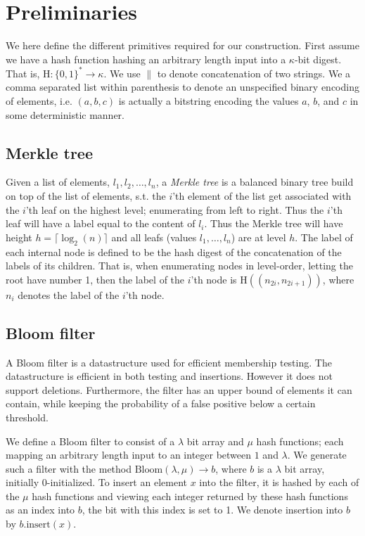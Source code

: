 \documentclass[11pt]{article} %
\newcommand{\Hash}{\ensuremath{\mathrm{H}}}
\newcommand{\Sib}{\ensuremath{\mathrm{Sib}}}
\newcommand{\Bloom}{\ensuremath{\mathrm{Bloom}}}
\renewcommand{\insert}{\ensuremath{\mathrm{insert}}}
\begin{document}
\section{Preliminaries}
We here define the different primitives required for our construction. First assume we have a hash function hashing an arbitrary length input into a $\kappa$-bit digest. That is, $\Hash:\{0,1\}^*\to \kappa$. We use $\|$ to denote concatenation of two strings. We a comma separated list within parenthesis to denote an unspecified binary encoding of elements, i.e. $(a, b, c)$ is actually a bitstring encoding the values $a$, $b$, and $c$ in some deterministic manner. 

\subsection{Merkle tree}
Given a list of elements, $l_1, l_2, \dots, l_n$, a \emph{Merkle tree} is a balanced binary tree build on top of the list of elements, s.t. the $i$'th element of the list get associated with the $i$'th leaf on the highest level; enumerating from left to right. Thus the $i$'th leaf will have a label equal to the content of $l_i$. Thus the Merkle tree will have height $h=\lceil \log_2(n) \rceil$ and all leafs (values $l_1, \dots, l_n$) are at level $h$. The label of each internal node is defined to be the hash digest of the concatenation of the labels of its children. That is, when enumerating nodes in level-order, letting the root have number 1, then the label of the $i$'th node is $\Hash((n_{2i}, n_{2i+1}))$, where $n_{i}$ denotes the label of the $i$'th node. 


\subsection{Bloom filter}
A Bloom filter is a datastructure used for efficient membership testing. The datastructure is efficient in both testing and insertions. However it does not support deletions. Furthermore, the filter has an upper bound of elements it can contain, while keeping the probability of a false positive below a certain threshold.

We define a Bloom filter to consist of a $\lambda$ bit array and $\mu$ hash functions; each mapping an arbitrary length input to an integer between $1$ and $\lambda$. We generate such a filter with the method $\Bloom(\lambda, \mu)\to b$, where $b$ is a $\lambda$ bit array, initially 0-initialized. To insert an element $x$ into the filter, it is hashed by each of the $\mu$ hash functions and viewing each integer returned by these hash functions as an index into $b$, the bit with this index is set to 1. We denote insertion into $b$ by $b.\insert(x)$. 
\end{document}
